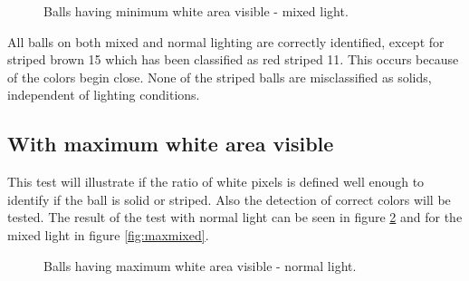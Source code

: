 \begin{figure}[htpb]
  \centering
  \quad
  \quad
   \caption{Balls having minimum white area visible - mixed light.}
  \label{fig:minmixed}
\end{figure}
All balls on both mixed and normal lighting are correctly identified, except for striped brown 15 which has been classified as red striped 11. This occurs because of the colors begin close. None of the striped balls are misclassified as solids, independent of lighting conditions.

\subsection{With maximum white area visible}
This test will illustrate if the ratio of white pixels is defined well enough to identify if the ball is solid or striped. Also the detection of correct colors will be tested. The result of the test with normal light can be seen in figure \ref{fig:maxnormal} and for the mixed light in figure \ref{fig:maxmixed}.

\begin{figure}[htpb]
  \centering
  \quad
	\quad
   \caption{Balls having maximum white area visible - normal light.}
  \label{fig:maxnormal}
\end{figure}

